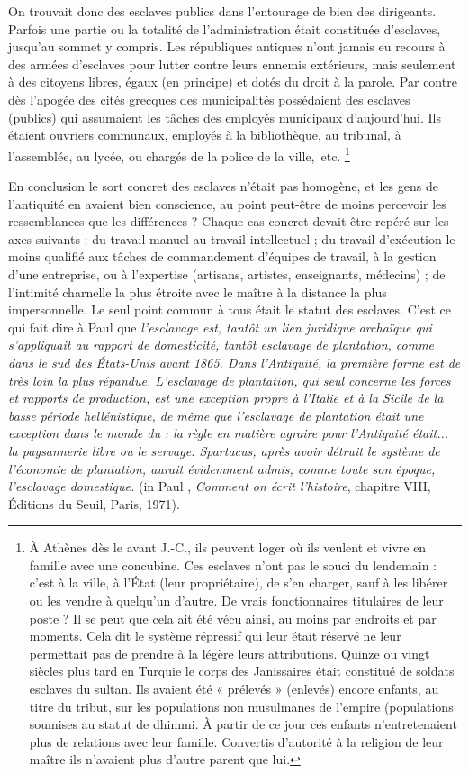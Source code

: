 On trouvait donc des esclaves publics dans l'entourage de bien des
dirigeants. Parfois une partie ou la totalité de l'administration était constituée
d'esclaves, jusqu'au sommet y compris. Les républiques antiques
n'ont jamais eu recours à des armées d'esclaves pour lutter contre leurs
ennemis extérieurs, mais seulement à des citoyens libres, égaux (en principe)
et dotés du droit à la parole. Par contre dès l'apogée des cités grecques
des municipalités possédaient des esclaves (publics) qui assumaient
les tâches des employés municipaux d'aujourd'hui. Ils étaient ouvriers
communaux, employés à la bibliothèque, au tribunal, à l'assemblée, au lycée,
ou chargés de la police de la ville,~etc.%
\footnote{À Athènes dès le  avant J.-C., ils peuvent loger où ils veulent et vivre en famille avec une concubine. Ces esclaves n'ont pas le souci du lendemain : c'est à la ville, à l'État (leur propriétaire), de s'en charger, sauf à les libérer ou les vendre à quelqu'un d'autre. De vrais fonctionnaires titulaires de leur poste ? Il se peut que cela ait été vécu ainsi, au moins par endroits et par moments. Cela dit le système répressif qui leur était réservé ne leur permettait pas de prendre à la légère leurs attributions. Quinze ou vingt siècles plus tard en Turquie le corps des Janissaires était constitué de soldats esclaves du sultan. Ils avaient été « prélevés » (enlevés) encore enfants, au titre du tribut, sur les populations non musulmanes de l'empire (populations soumises au statut de dhimmi. À partir de ce jour ces enfants n'entretenaient plus de relations avec leur famille. Convertis d'autorité à la religion de leur maître ils n'avaient plus d'autre parent que lui.}

En conclusion le sort concret des esclaves n'était pas homogène,
et les gens de l'antiquité en avaient bien conscience, au point peut-être de
moins percevoir les ressemblances que les différences ? Chaque cas
concret devait être repéré sur les axes suivants : du travail manuel au travail
intellectuel ; du travail d'exécution le moins qualifié aux tâches de
commandement d'équipes de travail, à la gestion d'une entreprise, ou à
l'expertise (artisans, artistes, enseignants, médecins) ; de l'intimité charnelle
la plus étroite avec le maître à la distance la plus impersonnelle. Le
seul point commun à tous était le statut des esclaves. C'est ce qui fait dire
à Paul  que {\emph{l'esclavage est, tantôt un lien juridique archaïque qui s'appliquait
au rapport de domesticité, tantôt esclavage de plantation, comme dans le sud
des États-Unis avant 1865. Dans l'Antiquité, la première forme est de très loin la
plus répandue. L'esclavage de plantation, qui seul concerne les forces et rapports de
production, est une exception propre à l'Italie et à la Sicile de la basse période hellénistique,
de même que l'esclavage de plantation était une exception dans le monde du  :
la règle en matière agraire pour l'Antiquité était... la paysannerie libre
ou le servage. Spartacus, après avoir détruit le système de l'économie de plantation,
aurait évidemment admis, comme toute son époque, l'esclavage domestique.}} (in Paul
, \emph{Comment on écrit l'histoire}, chapitre VIII, Éditions du Seuil, Paris,
1971).


